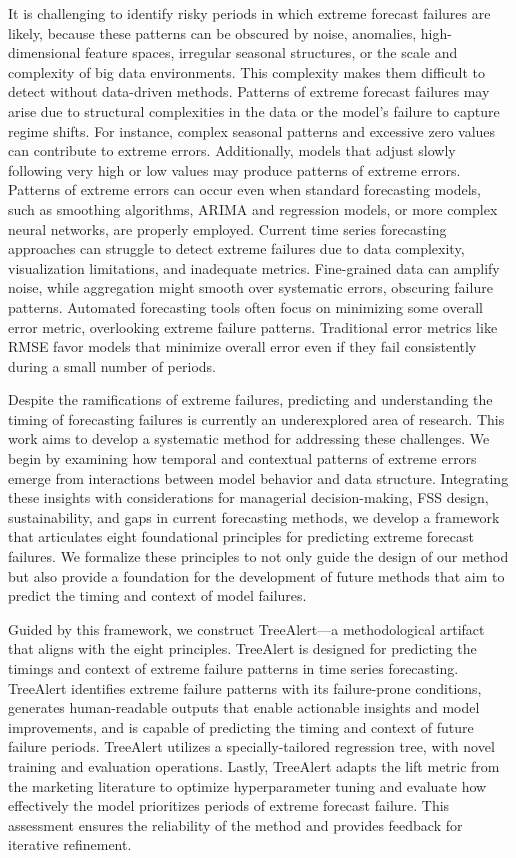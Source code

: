 \documentclass[12pt]{article}
\begin{document}
It is challenging to identify risky periods in which extreme forecast failures are likely, because these patterns can be obscured by noise, anomalies, high-dimensional feature spaces, irregular seasonal structures, or the scale and complexity of big data environments. This complexity makes them difficult to detect without data-driven methods. Patterns of extreme forecast failures may arise due to structural complexities in the data or the model’s failure to capture regime shifts. For instance, complex seasonal patterns and excessive zero values can contribute to extreme errors. Additionally, models that adjust slowly following very high or low values may produce patterns of extreme errors. Patterns of extreme errors can occur even when standard forecasting models, such as smoothing algorithms, ARIMA and %
regression models, or more complex neural networks, are properly employed. Current time series forecasting approaches can struggle to detect extreme failures due to data complexity, visualization limitations, and inadequate metrics. Fine-grained data can amplify noise, while aggregation might smooth over systematic errors, obscuring failure patterns. Automated forecasting tools often focus on minimizing some overall error metric, overlooking extreme failure patterns. Traditional error metrics like RMSE %
favor models that minimize overall error even if they fail consistently during a small number of periods. 

Despite the ramifications of extreme failures, predicting and understanding the timing of forecasting failures is currently an underexplored area of research. This work aims to develop a systematic method for addressing these challenges. We begin by examining how temporal and contextual patterns of extreme errors emerge from interactions between model behavior and data structure. Integrating these insights with considerations for managerial decision-making, FSS design, sustainability, and gaps in current forecasting methods, we develop a framework that articulates eight foundational principles for predicting extreme forecast failures. We formalize these principles to not only guide the design of our method but also provide a foundation for the development of future methods that aim to predict the timing and context of model failures. 

Guided by this framework, we construct TreeAlert---a methodological artifact that aligns with the eight principles. TreeAlert is designed for predicting the timings and context of extreme failure patterns in time series forecasting. TreeAlert identifies extreme failure patterns with its failure-prone conditions, generates human-readable outputs that enable actionable insights and model improvements, and is capable of predicting the timing and context of future failure periods. TreeAlert utilizes a specially-tailored regression tree, with novel training and evaluation operations. Lastly, TreeAlert adapts the lift metric from the marketing literature to optimize hyperparameter tuning and evaluate how effectively the model prioritizes periods of extreme forecast failure. This assessment ensures the reliability of the method and provides feedback for iterative refinement.
\end{document}
